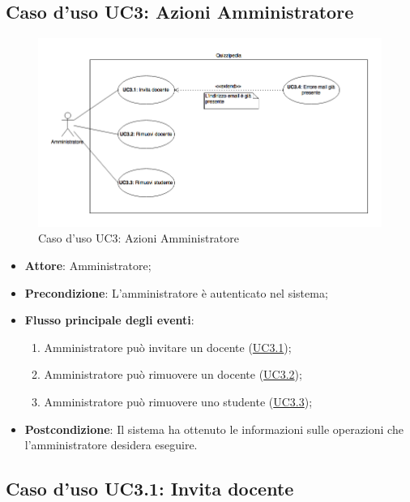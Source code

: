 \documentclass[12pt,a4paper]{article}
\begin{document}
\subsection{Caso d'uso UC3: Azioni Amministratore}
\begin{figure}[H]
	\centering
	\includegraphics[width=\textwidth]{../img/diagramUC3.png}
	\caption{Caso d'uso UC3: Azioni Amministratore}\label{fig:UC3} 
\end{figure}
\begin{itemize}

\item \textbf{Attore}: Amministratore; 
\item \textbf{Precondizione}: L'amministratore è autenticato nel sistema;

\item \textbf{Flusso principale degli eventi}:
\begin{enumerate}
	\item Amministratore può  invitare un docente (\hyperlink{UC3.1}{UC3.1});
	\item Amministratore può rimuovere un docente (\hyperlink{UC3.2}{UC3.2});
	\item Amministratore può rimuovere uno studente (\hyperlink{UC3.3}{UC3.3});
	
\end{enumerate}
\item \textbf{Postcondizione}: Il sistema ha ottenuto le informazioni sulle operazioni che
l’amministratore desidera eseguire.
\end{itemize}
\hypertarget{UC3.1}{}
\subsection{Caso d'uso UC3.1: Invita docente}
\end{document}
